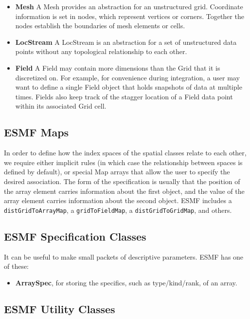 \begin{itemize}
\item {\bf Mesh}  A Mesh provides an abstraction for an unstructured 
grid.  Coordinate information is set in nodes, which represent
vertices or corners.  Together the nodes establish the boundaries 
of mesh elements or cells.

\item {\bf LocStream}  A LocStream is an abstraction for a set of 
unstructured data points without any topological relationship to each 
other.  

\item {\bf Field}  A Field may contain more dimensions than the 
Grid that it is discretized on.  For example, for convenience 
during integration, a user may want to define a single Field object 
that holds snapshots of data at multiple times.  Fields also 
keep track of the stagger location of a Field data point within its 
associated Grid cell.

\end{itemize}

\subsection{ESMF Maps}

In order to define how the index spaces of the spatial classes relate
to each other, we require either implicit rules (in which case the
relationship between spaces is defined by default), or special Map arrays
that allow the user to specify the desired association.  The form of the 
specification is usually that the position of the array element carries
information about the first object, and the value of the array element carries
information about the second object.  ESMF includes a {\tt distGridToArrayMap},
a {\tt gridToFieldMap}, a {\tt distGridToGridMap}, and others.

\subsection{ESMF Specification Classes}

It can be useful to make small packets
of descriptive parameters.  ESMF has one of these:
\begin{itemize}
\item {\bf ArraySpec}, for storing the specifics, such as type/kind/rank,
of an array.
\end{itemize}

\subsection{ESMF Utility Classes}

